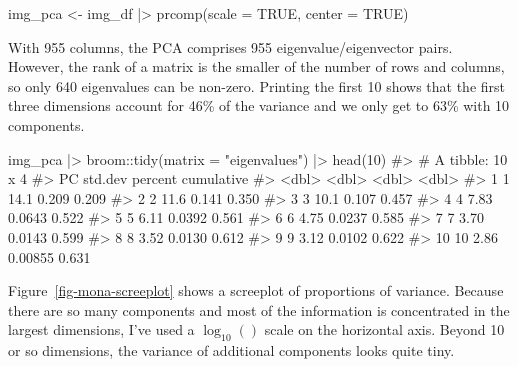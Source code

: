 \documentclass[
  letterpaper,
  10pt,
  krantz2]{krantz}
\makeatletter
\newenvironment{Shaded}{\begin{snugshade}}{\end{snugshade}}
\newcommand{\AttributeTok}[1]{\textcolor[rgb]{0.40,0.45,0.13}{#1}}
\newcommand{\CommentTok}[1]{\textcolor[rgb]{0.37,0.37,0.37}{#1}}
\newcommand{\ConstantTok}[1]{\textcolor[rgb]{0.56,0.35,0.01}{#1}}
\newcommand{\DecValTok}[1]{\textcolor[rgb]{0.68,0.00,0.00}{#1}}
\newcommand{\FunctionTok}[1]{\textcolor[rgb]{0.28,0.35,0.67}{#1}}
\newcommand{\NormalTok}[1]{\textcolor[rgb]{0.00,0.23,0.31}{#1}}
\newcommand{\OtherTok}[1]{\textcolor[rgb]{0.00,0.23,0.31}{#1}}
\newcommand{\SpecialCharTok}[1]{\textcolor[rgb]{0.37,0.37,0.37}{#1}}
\newcommand{\StringTok}[1]{\textcolor[rgb]{0.13,0.47,0.30}{#1}}
\newenvironment{kframe}{%
  \medskip{}
  \setlength{\fboxsep}{.8em}
  \def\at@end@of@kframe{}%
  \ifinner\ifhmode%
  \def\at@end@of@kframe{\end{minipage}}%
  \begin{minipage}{\columnwidth}%
  \fi\fi%
  \def\FrameCommand##1{\hskip\@totalleftmargin \hskip-\fboxsep
  \colorbox{shadecolor}{##1}\hskip-\fboxsep
      \hskip-\linewidth \hskip-\@totalleftmargin \hskip\columnwidth}%
  \MakeFramed {\advance\hsize-\width
    \@totalleftmargin\z@ \linewidth\hsize
    \@setminipage}}%
{\par\unskip\endMakeFramed%
  \at@end@of@kframe}
\renewenvironment{Shaded}{\begin{kframe}}{\end{kframe}}
\makeatother
\begin{document}
\begin{Shaded}
\begin{Highlighting}[]
\NormalTok{img\_pca }\OtherTok{\textless{}{-}}\NormalTok{ img\_df }\SpecialCharTok{|\textgreater{}}
  \FunctionTok{prcomp}\NormalTok{(}\AttributeTok{scale =} \ConstantTok{TRUE}\NormalTok{, }\AttributeTok{center =} \ConstantTok{TRUE}\NormalTok{)}
\end{Highlighting}
\end{Shaded}

With 955 columns, the PCA comprises 955 eigenvalue/eigenvector pairs.
However, the rank of a matrix is the smaller of the number of rows and
columns, so only 640 eigenvalues can be non-zero. Printing the first 10
shows that the first three dimensions account for 46\% of the variance
and we only get to 63\% with 10 components.

\begin{Shaded}
\begin{Highlighting}[]
\NormalTok{img\_pca }\SpecialCharTok{|\textgreater{}}
\NormalTok{  broom}\SpecialCharTok{::}\FunctionTok{tidy}\NormalTok{(}\AttributeTok{matrix =} \StringTok{"eigenvalues"}\NormalTok{) }\SpecialCharTok{|\textgreater{}} \FunctionTok{head}\NormalTok{(}\DecValTok{10}\NormalTok{)}
\CommentTok{\#\textgreater{} \# A tibble: 10 x 4}
\CommentTok{\#\textgreater{}       PC std.dev percent cumulative}
\CommentTok{\#\textgreater{}    \textless{}dbl\textgreater{}   \textless{}dbl\textgreater{}   \textless{}dbl\textgreater{}      \textless{}dbl\textgreater{}}
\CommentTok{\#\textgreater{}  1     1   14.1  0.209        0.209}
\CommentTok{\#\textgreater{}  2     2   11.6  0.141        0.350}
\CommentTok{\#\textgreater{}  3     3   10.1  0.107        0.457}
\CommentTok{\#\textgreater{}  4     4    7.83 0.0643       0.522}
\CommentTok{\#\textgreater{}  5     5    6.11 0.0392       0.561}
\CommentTok{\#\textgreater{}  6     6    4.75 0.0237       0.585}
\CommentTok{\#\textgreater{}  7     7    3.70 0.0143       0.599}
\CommentTok{\#\textgreater{}  8     8    3.52 0.0130       0.612}
\CommentTok{\#\textgreater{}  9     9    3.12 0.0102       0.622}
\CommentTok{\#\textgreater{} 10    10    2.86 0.00855      0.631}
\end{Highlighting}
\end{Shaded}

Figure~\ref{fig-mona-screeplot} shows a screeplot of proportions of
variance. Because there are so many components and most of the
information is concentrated in the largest dimensions, I've used a
\(\log_{10}()\) scale on the horizontal axis. Beyond 10 or so
dimensions, the variance of additional components looks quite tiny.
\end{document}
